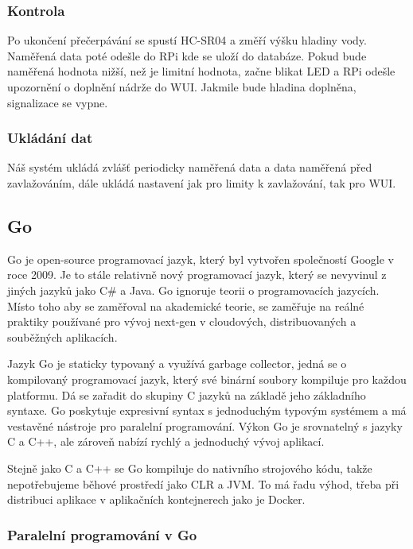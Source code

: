 \documentclass[12pt,a4paper]{article}
\begin{document}
\subsubsection{Kontrola}

Po ukončení přečerpávání se spustí \ac{HC-SR04} a změří výšku hladiny vody. Naměřená data poté odešle do \ac{RPi} kde se uloží do databáze. Pokud bude naměřená hodnota nižší, než je limitní hodnota, začne blikat \ac{LED} a \ac{RPi} odešle upozornění o doplnění nádrže do \ac{WUI}. Jakmile bude hladina doplněna, signalizace se vypne.

\subsubsection{Ukládání dat}

Náš systém ukládá zvlášť periodicky naměřená data a data naměřená před zavlažováním, dále ukládá nastavení jak pro limity k zavlažování, tak pro \ac{WUI}.

\subsection{Go}

Go je open-source programovací jazyk, který byl vytvořen společností Google v roce 2009. Je to stále relativně nový programovací jazyk, který se nevyvinul z jiných jazyků jako C\# a Java. Go ignoruje teorii o programovacích jazycích. Místo toho aby se zaměřoval na akademické teorie, se zaměřuje na reálné praktiky používané pro vývoj next-gen v cloudových, distribuovaných a souběžných aplikacích.

Jazyk Go je staticky typovaný a využívá garbage collector, jedná se o kompilovaný programovací jazyk, který své binární soubory kompiluje pro každou platformu. Dá se zařadit do skupiny C jazyků na základě jeho základního syntaxe. Go poskytuje expresivní syntax s jednoduchým typovým systémem a má vestavěné nástroje pro paralelní programování. Výkon Go je srovnatelný s jazyky C a C++, ale zároveň nabízí rychlý a jednoduchý vývoj aplikací.

Stejně jako C a C++ se Go kompiluje do nativního strojového kódu, takže nepotřebujeme běhové prostředí jako \ac{CLR} a \ac{JVM}. To má řadu výhod, třeba při distribuci aplikace v aplikačních kontejnerech jako je Docker.

\subsubsection{Paralelní programování v Go}
\end{document}
